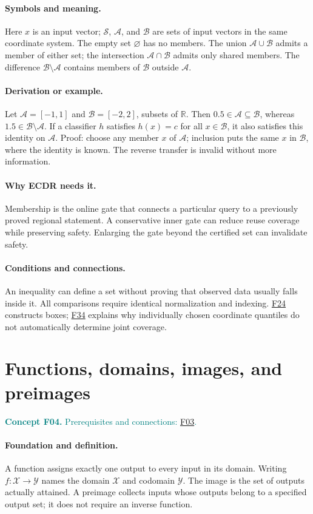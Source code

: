 \documentclass[11pt,a4paper]{article}
\newcommand{\R}{\mathbb R}
\newcommand{\conceptid}{Front matter}
\newcommand{\concept}[3]{\clearpage\renewcommand{\conceptid}{#1}%
\section{#2}\label{concept:#1}%
\textcolor{teal}{\textbf{Concept #1.} Prerequisites and connections: #3.}\par
\typeout{ECDR-CONCEPT-START #1 PAGE=\thepage}}
\begin{document}
\paragraph{Symbols and meaning.}
Here $x$ is an input vector; $\mathcal S$, $\mathcal A$, and
$\mathcal B$ are sets of input vectors in the same coordinate system.
The empty set $\varnothing$ has no members. The union
$\mathcal A\cup\mathcal B$ admits a member of either set; the
intersection $\mathcal A\cap\mathcal B$ admits only shared members.
The difference $\mathcal B\setminus\mathcal A$ contains members of
$\mathcal B$ outside $\mathcal A$.
\paragraph{Derivation or example.}
Let $\mathcal A=[-1,1]$ and $\mathcal B=[-2,2]$, subsets of $\R$.
Then $0.5\in\mathcal A\subseteq\mathcal B$, whereas
$1.5\in\mathcal B\setminus\mathcal A$. If a classifier $h$ satisfies
$h(x)=c$ for all $x\in\mathcal B$, it also satisfies this identity on
$\mathcal A$. Proof: choose any member $x$ of $\mathcal A$; inclusion
puts the same $x$ in $\mathcal B$, where the identity is known.
The reverse transfer is invalid without more information.
\paragraph{Why ECDR needs it.}
Membership is the online gate that connects a particular query to a
previously proved regional statement. A conservative inner gate can
reduce reuse coverage while preserving safety. Enlarging the gate beyond
the certified set can invalidate safety.
\paragraph{Conditions and connections.}
An inequality can define a set without proving that observed data usually
falls inside it. All comparisons require identical normalization and
indexing. \hyperref[concept:F24]{F24} constructs boxes; \hyperref[concept:F34]{F34} explains why individually chosen
coordinate quantiles do not automatically determine joint coverage.
\par\label{endconcept:F03}

\concept{F04}{Functions, domains, images, and preimages}{\hyperref[concept:F03]{F03}}
\paragraph{Foundation and definition.}
A function assigns exactly one output to every input in its domain.
Writing $f:\mathcal X\to\mathcal Y$ names the domain $\mathcal X$
and codomain $\mathcal Y$. The image is the set of outputs actually
attained. A preimage collects inputs whose outputs belong to a specified
output set; it does not require an inverse function.
\end{document}
